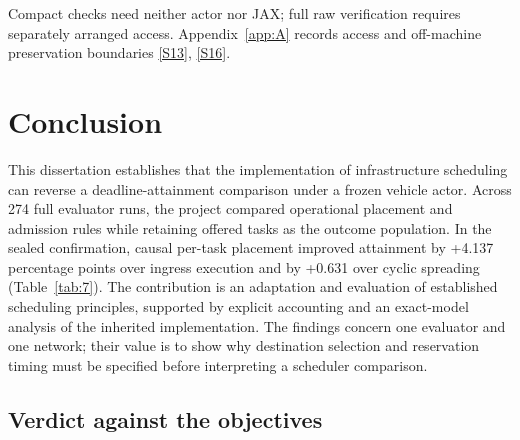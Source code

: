 \documentclass[12pt,a4paper]{article}
\begin{document}
Compact checks need neither actor nor JAX; full raw verification requires separately arranged access. Appendix~\ref{app:A} records access and off-machine preservation boundaries \hyperref[source-s13]{[S13]}, \hyperref[source-s16]{[S16]}.

\section{Conclusion}\label{sec:4}

This dissertation establishes that the implementation of infrastructure scheduling can reverse a deadline-attainment comparison under a frozen vehicle actor. Across 274 full evaluator runs, the project compared operational placement and admission rules while retaining offered tasks as the outcome population. In the sealed confirmation, causal per-task placement improved attainment by +4.137 percentage points over ingress execution and by +0.631 over cyclic spreading (Table~\ref{tab:7}). The contribution is an adaptation and evaluation of established scheduling principles, supported by explicit accounting and an exact-model analysis of the inherited implementation. The findings concern one evaluator and one network; their value is to show why destination selection and reservation timing must be specified before interpreting a scheduler comparison.



\FloatBarrier
\subsection{Verdict against the objectives}\label{sec:4.1}
\end{document}
